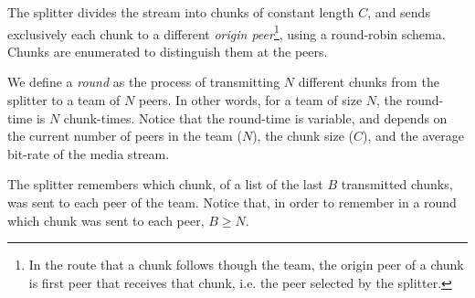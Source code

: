 
\label{sec:feeding_the_team}

The splitter divides the stream into chunks of constant length $C$,
and sends exclusively each chunk to a different \emph{origin
  peer}\footnote{In the route that a chunk follows though the team,
  the origin peer of a chunk is first peer that receives that chunk,
  i.e. the peer selected by the splitter.}, using a round-robin
schema. Chunks are enumerated to distinguish them at the peers.

\begin{comment}
More details about the implementation
are available in Fig.~\ref{fig:chunk_generation}.


\begin{figure*}
  \fig{500}{5cm}{DBS_splitter_feed} \caption{Chunk
    generation at the splitter and their transmission to the
    team.\label{fig:chunk_generation}}
\end{figure*}
\end{comment}

We define a \emph{round} as the process of transmitting $N$ different
chunks from the splitter to a team of $N$ peers. In other words, for a
team of size $N$, the round-time is $N$ chunk-times. Notice that the
round-time is variable, and depends on the current number of peers in
the team ($N$), the chunk size ($C$), and the average bit-rate of the
media stream.

The splitter remembers which chunk, of a list of the last $B$
transmitted chunks, was sent to each peer of the team. Notice that, in
order to remember in a round which chunk was sent to each peer, $B\ge
N$. 

\begin{comment}
(in a team) as the time necessary to send two consecutive chunks from
  the splitter (of such team) to the same peer, using the
  round-robing. This time is variable and depends on $|T|$, $C$, and
  the average bit-rate of the media, $A$.
\end{comment}

\begin{comment}
The round-time is defined by:
\begin{equation}
  \cal{r} = \cal{c}N.
  \label{eq:round_time}
\end{equation}
For example, if we use only one team of $N=256$ peers, a chunk size
$C=1024$~bytes, and a video of $1$~Mb/s, the round time is
\begin{displaymath}
  \cal{r} = \frac{1024\frac{\text{bytes}}{\text{chunk}}\times
    8\frac{\text{bits}}{\text{byte}}}{10^6\frac{\text{bits}}{\text{second}}}\times
  256 \approx 2.1~\text{seconds}.
\end{displaymath}
\end{comment}

